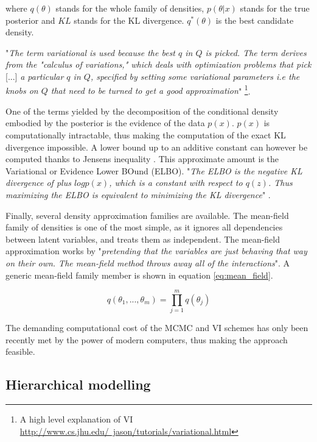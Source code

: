 where $q(\theta)$ stands for the whole family of densities, $p(\theta|x)$ stands for the true posterior and $KL$ stands for the \ac{KL} divergence. $q^*(\theta)$ is the best candidate density.

"\textit{The term variational is used because the best $q$ in $Q$ is picked. The term derives from the "calculus of variations," which deals with optimization problems that pick} [...] \textit{a particular $q$ in $Q$, specified by setting some variational parameters i.e the knobs on $Q$ that need to be turned to get a good approximation}"  \footnote{A high level explanation of \ac{VI} \href{http://www.cs.jhu.edu/~jason/tutorials/variational.html}{http://www.cs.jhu.edu/~jason/tutorials/variational.html}\label{fn:vi}}.

One of the terms yielded by the decomposition of the conditional density embodied by the posterior is the evidence of the data $p(x)$.  $p(x)$ is computationally intractable, thus making the computation of the exact \ac{KL} divergence impossible. A lower bound up to an additive constant can however be computed thanks to Jensen\textquotesingle s inequality \cite{jensen1906fonctions}. This approximate amount is the Variational or Evidence Lower BOund (\ac{ELBO}). "\textit{The \ac{ELBO} is the negative \ac{KL} divergence of plus $logp(x)$, which is a constant with respect to $q(z)$. Thus maximizing
the \ac{ELBO} is equivalent to minimizing the \ac{KL} divergence}" \cite{Blei2017}.

Finally, several density approximation families are available. The mean-field family of densities is one of the most simple, as it ignores all dependencies between latent variables, and treats them as independent. The mean-field approximation works by "\textit{pretending that the variables are just behaving that way on their own. The mean-field method throws away all of the interactions}". A generic mean-field family member is shown in equation \ref{eq:mean_field}.

\begin{equation}\label{eq:mean_field}
q(\theta_1, ..., \theta_m) = \prod_{j=1}^{m}{q(\theta_j)}
\end{equation} 

The demanding computational cost of the \ac{MCMC} and \ac{VI} schemes has only been recently met by the power of modern computers, thus making the approach feasible.

\subsection{Hierarchical modelling}
\label{subsec:hierarchy}


